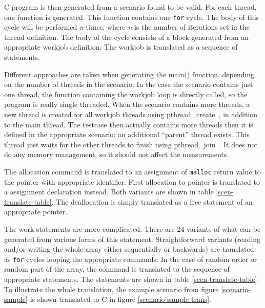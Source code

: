 C program is then generated from a scenario found to be valid. For each thread,
one function is generated. This function contains one {\tt for} cycle. The body
of this cycle will be performed {\em n}-times, where {\em n} is the number of
iterations set in the thread definition. The body of the cycle consists of a
block generated from an appropriate workjob definition. The workjob is
translated as a sequence of statements.

Different approaches are taken when generating the main() function, depending on the number of threads in the scenario. In the case the scenario contains just one thread, the function containing the workjob loop is directly called, so the program is really single threaded. When the scenario contains more threads, a new thread is created for all workjob threads using pthread\_create~\cite{man-pthread_create}, in addition to the main thread. The testcase then actually contains more threads then it is defined in the appropriate scenario: an additional ``parent'' thread exists. This thread just waits for the other threads to finish using pthread\_join~\cite{man-pthread_join}. It does not do any memory management, so it should not affect the measurements.

The allocation command is translated to an assignment of {\tt malloc} return
value to the pointer with appropriate identifier. First allocation to pointer is
translated to a assignment declaration instead. Both variants are shown in table
\ref{scen-translate-table}. The deallocation is simply translated as a free
statement of an appropriate pointer.

The work statements are more complicated. There are 24 variants of what can be
generated from various forms of this statement. Straightforward variants
(reading and/or writing the whole array either sequentially or backwards) are
translated as {\tt for} cycles looping the appropriate commands. In the case of
random order or random part of the array, the command is translated to the
sequence of appropriate statements. The statements are shown in table
\ref{scen-translate-table}. To illustrate the whole translation, the example
scenario from figure \ref{scenario-sample} is shown translated to C in figure
\ref{scenario-sample-trans}.

